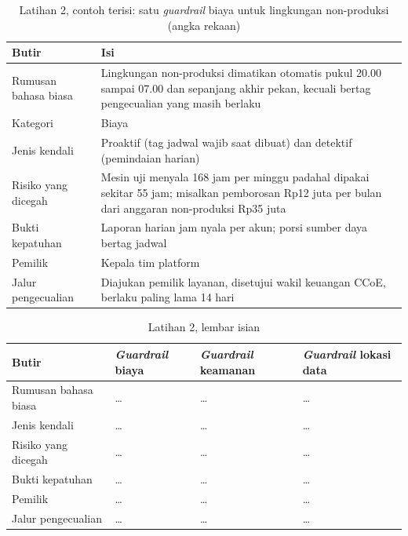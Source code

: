 \begin{table}[!htb]
  \centering
  \caption{Latihan 2, contoh terisi: satu \textit{guardrail} biaya untuk lingkungan non-produksi
           (angka rekaan)}
  \label{tab:ch14-lat2-contoh}
  \footnotesize
  \begin{tabularx}{\textwidth}{>{\raggedright\arraybackslash}p{3.0cm}
      >{\raggedright\arraybackslash}X}
    \hline
    \textbf{Butir} & \textbf{Isi} \\ \hline
    Rumusan bahasa biasa & Lingkungan non-produksi dimatikan otomatis pukul 20.00 sampai 07.00
      dan sepanjang akhir pekan, kecuali bertag pengecualian yang masih berlaku \\ \hline
    Kategori & Biaya \\ \hline
    Jenis kendali & Proaktif (tag jadwal wajib saat dibuat) dan detektif (pemindaian harian) \\
      \hline
    Risiko yang dicegah & Mesin uji menyala 168 jam per minggu padahal dipakai sekitar 55 jam;
      misalkan pemborosan Rp12 juta per bulan dari anggaran non-produksi Rp35 juta \\ \hline
    Bukti kepatuhan & Laporan harian jam nyala per akun; porsi sumber daya bertag jadwal \\ \hline
    Pemilik & Kepala tim platform \\ \hline
    Jalur pengecualian & Diajukan pemilik layanan, disetujui wakil keuangan CCoE, berlaku paling
      lama 14 hari \\ \hline
  \end{tabularx}
\end{table}

\begin{table}[!htb]
  \centering
  \caption{Latihan 2, lembar isian}
  \label{tab:ch14-lat2-hasil}
  \footnotesize
  \begin{tabularx}{\textwidth}{>{\raggedright\arraybackslash}p{3.0cm}
      >{\raggedright\arraybackslash}X >{\raggedright\arraybackslash}X
      >{\raggedright\arraybackslash}X}
    \hline
    \textbf{Butir} & \textbf{\textit{Guardrail} biaya} & \textbf{\textit{Guardrail} keamanan} &
      \textbf{\textit{Guardrail} lokasi data} \\ \hline
    Rumusan bahasa biasa & \dots & \dots & \dots \\ \hline
    Jenis kendali & \dots & \dots & \dots \\ \hline
    Risiko yang dicegah & \dots & \dots & \dots \\ \hline
    Bukti kepatuhan & \dots & \dots & \dots \\ \hline
    Pemilik & \dots & \dots & \dots \\ \hline
    Jalur pengecualian & \dots & \dots & \dots \\ \hline
  \end{tabularx}
\end{table}

